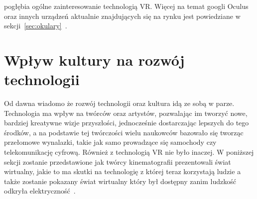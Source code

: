 pogłębia ogólne zainteresowanie technologią VR. Więcej na temat googli Oculus oraz innych urządzeń aktualnie znajdujących się na rynku jest powiedziane w sekcji~\ref{sec:okulary}~\cite{historia}.
  
\section{Wpływ kultury na rozwój technologii}
\label{sec:wplyw}
Od dawna wiadomo że rozwój technologii oraz kultura idą ze sobą w parze. Technologia ma wpływ na twórców oraz artystów, pozwalając im tworzyć nowe, bardziej kreatywne wizje przyszłości, jednocześnie dostarczając lepszych do tego środków, a na podstawie tej twórczości wielu naukowców bazowało się tworząc przełomowe wynalazki, takie jak samo prowadzące się samochody czy telekomunikację cyfrową. Również z technologią VR nie było inaczej. W poniższej sekcji zostanie przedstawione jak twórcy kinematografii prezentowali świat wirtualny, jakie to ma skutki na technologię z której teraz korzystają ludzie a także zostanie pokazany świat wirtualny który był dostępny zanim ludzkość odkryła elektryczność~\cite{wynalazki}.

